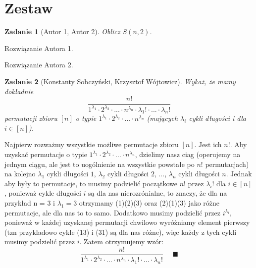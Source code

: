 \documentclass{mwart}
\newtheorem{zad}{Zadanie}[section]
\begin{document}
\newpage
\section{Zestaw}          %

\begin{zad}[Autor 1, Autor 2]
    Oblicz $S(n, 2)$.
\end{zad}
\begin{mdframed}
    Rozwiązanie Autora 1.
\end{mdframed}
\begin{mdframed}
    Rozwiązanie Autora 2.
\end{mdframed}




\begin{zad}[Konstanty Sobczyński, Krzysztof Wójtowicz]
    Wykaż, że mamy dokładnie
    \[\frac{n!}{1^{\lambda_1} \cdot 2^{\lambda_2} \cdot  ... \cdot n^{\lambda_n} \cdot \lambda_1! \cdot ... \cdot \lambda_n!}\]
    permutacji zbioru $[n]$ o typie $1^{\lambda_1} \cdot 2^{\lambda_2} \cdot ... \cdot n^{\lambda_n} $  (mających $\lambda_i$ cykli długości i dla $i \in [n]$).
\end{zad}
\begin{mdframed}
    Najpierw rozważmy wszystkie możliwe permutacje zbioru $[n]$. Jest ich $n!$.
    \newline \newline
    Aby uzyskać permutacje o typie $1^{\lambda_1} \cdot 2^{\lambda_2} \cdot ... \cdot n^{\lambda_n}$, dzielimy nasz ciag (operujemy na jednym ciągu, ale jest to uogólnienie na wszystkie powstałe po $n!$ permutacjach) na kolejno $\lambda_1$ cykli długości $1$, $\lambda_2$ cykli długości $2$, ..., $\lambda_n$ cykli długości $n$.
    Jednak aby były to permutacje, to musimy podzielić początkowe $n!$ przez $\lambda_i!$ dla $i \in [n]$, ponieważ cykle długości $i$ są dla nas nierozrónialne, to znaczy, że dla na przykład n = 3 i $\lambda_1 = 3$ otrzymamy (1)(2)(3) oraz (2)(1)(3) jako różne permutacje, ale dla nas to to samo.
    \newline \newline
    Dodatkowo musimy podzielić przez $i^{\lambda_i}$, ponieważ w każdej uzyskanej permutacji chwilowo wyróżniamy element pierwszy (tzn przykladowo cykle (13) i (31) są dla nas różne), więc każdy z tych cykli musimy podzielić przez $i$. 
    \newline \newline
    Zatem otrzymujemy wzór:
    \[\frac{n!}{1^{\lambda_1} \cdot 2^{\lambda_2} \cdot  ... \cdot n^{\lambda_n} \cdot \lambda_1! \cdot ... \cdot \lambda_n!}\ \; \; \; \; \blacksquare\]
\end{mdframed}
\end{document}
